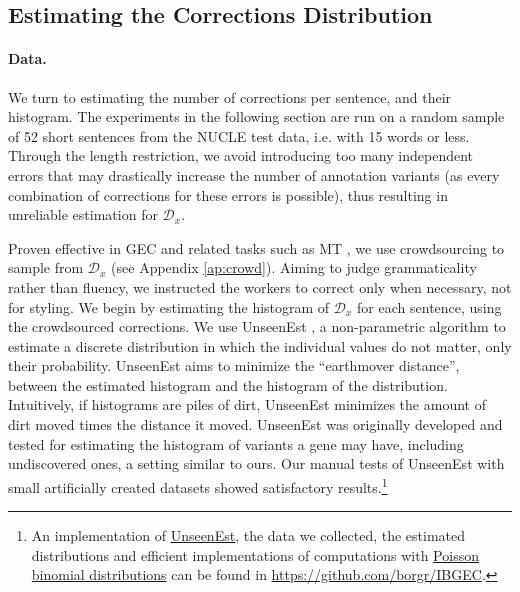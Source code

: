 \documentclass[11pt, a4paper]{article}
\begin{document}
\subsection{Estimating the Corrections Distribution}\label{subsec:corrections_distribution}
%
\paragraph{Data.}
We turn to estimating the number of corrections per sentence, and their histogram.
The experiments in the following section are run on a random sample of 52 short sentences from the NUCLE test data, i.e. with 15 words or less. Through the length restriction, we avoid introducing too many independent errors that may drastically increase the number of annotation variants (as every combination of corrections for these errors is possible), thus resulting in unreliable estimation for $\mathcal{D}_x$. 

Proven effective in GEC and related tasks such as MT \cite{zaidan2011crowdsourcing,madnani2011they,post2012constructing}, 
we use crowdsourcing to sample from $\mathcal{D}_x$ (see Appendix  \ref{ap:crowd}).
Aiming to judge grammaticality rather than fluency, we instructed the workers to correct only when necessary, not for styling.
We begin by estimating the histogram of $\mathcal{D}_x$ for each sentence, using the crowdsourced corrections.
We use {\sc UnseenEst} \cite{zou2015quantifying}, a non-parametric algorithm to
estimate a discrete distribution in which the individual values do not matter, only their probability. 
{\sc UnseenEst} aims to minimize the ``earthmover distance'', between the estimated histogram and the histogram of the distribution. 
Intuitively, if histograms are piles of dirt, {\sc UnseenEst} minimizes the amount of dirt moved times the distance it moved.
{\sc UnseenEst} was originally developed and tested for estimating the histogram of
variants a gene may have, including undiscovered ones, a setting similar to ours.
Our manual tests of {\sc UnseenEst} with small artificially created datasets
showed satisfactory results.\footnote{An implementation of \href{https://github.com/borgr/unseenest}{\sc UnseenEst}, the data we collected, the estimated distributions and efficient implementations of computations with \href{https://github.com/borgr/PoissonBinomial}{Poisson binomial distributions} can be found in \url{https://github.com/borgr/IBGEC}.}
\end{document}
